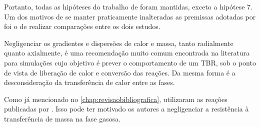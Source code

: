 Portanto, todas as hipóteses do trabalho de  foram
mantidas, exceto a hipótese $7$. Um dos motivos de se manter praticamente
inalteradas as premissas adotadas por  foi o de realizar
comparações entre os dois estudos.


Negligenciar os gradientes e dispersões de calor e massa, tanto radialmente
quanto axialmente, é uma recomendação muito comum encontrada na literatura
\cite{Ancheyta2011, Ranade2011, Froment2011} para simulações cujo objetivo é
prever o comportamento de um TBR, sob o ponto de vista de liberação de calor e
conversão das reações. Da mesma forma é a desconsideração da transferência de
calor entre as fases.

Como já mencionado no \autoref{chap:revisaobibliografica},
 utilizaram as reações publicadas por
. Isso pode ter motivado os autores a negligenciar a
resistência à transferência de massa na fase gasosa.

